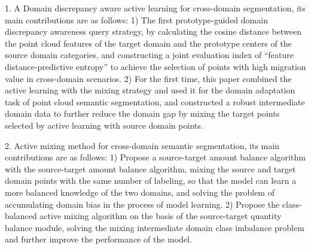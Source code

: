 1. A Domain discrepancy aware active learning for cross-domain segmentation, its main contributions are as follows: 1) The first prototype-guided domain discrepancy awareness query strategy, by calculating the cosine distance between the point cloud features of the target domain and the prototype centers of the source domain categories, and constructing a joint evaluation index of “feature distance-predictive entropy” to achieve the selection of points with high migration value in cross-domain scenarios. 2) For the first time, this paper combined the active learning with the mixing strategy and used it for the domain adaptation task of point cloud semantic segmentation, and constructed a robust intermediate domain data to further reduce the domain gap by mixing the target points selected by active learning with source domain points.

2. Active mixing method for cross-domain semantic segmentation, its main contributions are as follows: 1) Propose a source-target amount balance algorithm with the source-target amount balance algorithm, mixing the source and target domain points with the same number of labeling, so that the model can learn a more balanced knowledge of the two domains, and solving the problem of accumulating domain bias in the process of model learning. 2) Propose the class-balanced active mixing algorithm on the basis of the source-target quantity balance module, solving the mixing intermediate domain class imbalance problem and further improve the performance of the model.

